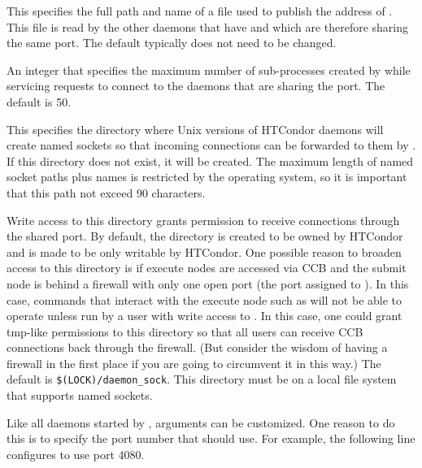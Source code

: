 \begin{description}

\label{param:SharedPortDaemonAdFile}
\item[\Macro{SHARED\_PORT\_DAEMON\_AD\_FILE}]
  This specifies the full path and name of a file used to publish the
  address of .  This file is read by the other
  daemons that have  and which are therefore
  sharing the same port.  The default typically does not need to be changed.

\label{param:SharedPortMaxWorkers}
\item[\Macro{SHARED\_PORT\_MAX\_WORKERS}] An integer that specifies
 the maximum number of sub-processes created by 
 while servicing requests to connect to the daemons that are sharing the port.
 The default is 50.

\label{param:DaemonSocketDir}
\item[\Macro{DAEMON\_SOCKET\_DIR}] This specifies the directory where
 Unix versions of HTCondor daemons will create named sockets so that incoming
 connections can be forwarded to them by .  If
 this directory does not exist, it will be created. The maximum length
 of named socket paths plus names is restricted by the operating system,
 so it is important that this path not exceed 90 characters.

Write access to this directory grants permission to receive
 connections through the shared port.  By default, the directory is
 created to be owned by HTCondor and is made to be only writable by
 HTCondor.  One possible reason to broaden access to this directory is
 if execute nodes are accessed via CCB and the submit node is behind a
 firewall with only one open port (the port assigned to
 ).  In this case, commands that interact with
 the execute node such as  will not be able to
 operate unless run by a user with write access to
 .  In this case, one could grant
 tmp-like permissions to this directory so that all users can receive
 CCB connections back through the firewall.  (But consider the wisdom
 of having a firewall in the first place if you are going to
 circumvent it in this way.)  The default
  is \verb|$(LOCK)/daemon_sock|.  This
 directory must be on a local file system that supports named sockets.

\label{param:SharedPortArgs}
\item[\Macro{SHARED\_PORT\_ARGS}] Like all daemons started by
 ,  arguments can be customized.
  One reason to do this is to specify the port number that
  should use.  For example, the following line
 configures  to use port 4080.


\end{description}
